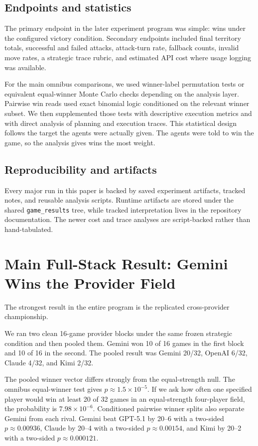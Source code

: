 \documentclass[11pt]{article}
\begin{document}
\subsection{Endpoints and statistics}

The primary endpoint in the later experiment program was simple: wins under the configured victory condition. Secondary endpoints included final territory totals, successful and failed attacks, attack-turn rate, fallback counts, invalid move rates, a strategic trace rubric, and estimated API cost where usage logging was available.

For the main omnibus comparisons, we used winner-label permutation tests or equivalent equal-winner Monte Carlo checks depending on the analysis layer. Pairwise win reads used exact binomial logic conditioned on the relevant winner subset. We then supplemented those tests with descriptive execution metrics and with direct analysis of planning and execution traces. This statistical design follows the target the agents were actually given. The agents were told to win the game, so the analysis gives wins the most weight.

\subsection{Reproducibility and artifacts}

Every major run in this paper is backed by saved experiment artifacts, tracked notes, and reusable analysis scripts. Runtime artifacts are stored under the shared \texttt{game\_results} tree, while tracked interpretation lives in the repository documentation. The newer cost and trace analyses are script-backed rather than hand-tabulated.

\section{Main Full-Stack Result: Gemini Wins the Provider Field}

The strongest result in the entire program is the replicated cross-provider championship.

We ran two clean 16-game provider blocks under the same frozen strategic condition and then pooled them. Gemini won 10 of 16 games in the first block and 10 of 16 in the second. The pooled result was Gemini 20/32, OpenAI 6/32, Claude 4/32, and Kimi 2/32.

The pooled winner vector differs strongly from the equal-strength null. The omnibus equal-winner test gives $p \approx 1.5\times10^{-5}$. If we ask how often one specified player would win at least 20 of 32 games in an equal-strength four-player field, the probability is $7.98\times10^{-6}$. Conditioned pairwise winner splits also separate Gemini from each rival. Gemini beat GPT-5.1 by 20--6 with a two-sided $p \approx 0.00936$, Claude by 20--4 with a two-sided $p \approx 0.00154$, and Kimi by 20--2 with a two-sided $p \approx 0.000121$.
\end{document}
